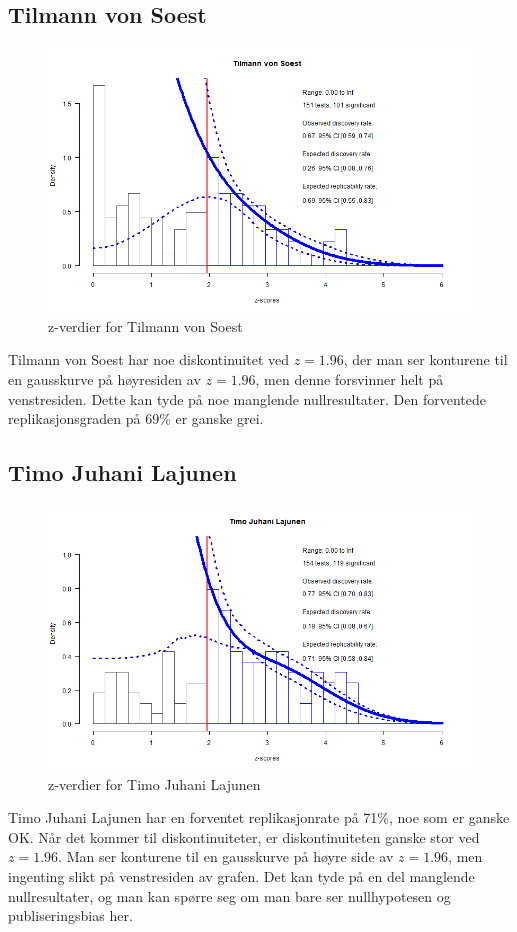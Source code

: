 \documentclass[doc,norsk]{apa7}
\begin{document}
\subsection{Tilmann von Soest}
\begin{figure}[h!]
    \centering
    \includegraphics[width=\textwidth]{images/Tilmann von Soest.png}
    \caption{z-verdier for Tilmann von Soest}
\end{figure}
Tilmann von Soest har noe diskontinuitet ved $z=1.96$, der man ser konturene til en gausskurve på høyresiden av $z=1.96$, men denne forsvinner helt på venstresiden. Dette kan tyde på noe manglende nullresultater. Den forventede replikasjonsgraden på 69\% er ganske grei.

\subsection{Timo Juhani Lajunen}
\begin{figure}[h!]
    \centering
    \includegraphics[width=\textwidth]{images/Timo Juhani Lajunen.png}
    \caption{z-verdier for Timo Juhani Lajunen}
\end{figure}
Timo Juhani Lajunen har en forventet replikasjonrate på 71\%, noe som er ganske OK. Når det kommer til diskontinuiteter, er diskontinuiteten ganske stor ved $z=1.96$. Man ser konturene til en gausskurve på høyre side av $z=1.96$, men ingenting slikt på venstresiden av grafen. Det kan tyde på en del manglende nullresultater, og man kan spørre seg om man bare ser nullhypotesen og publiseringsbias her.
\end{document}
